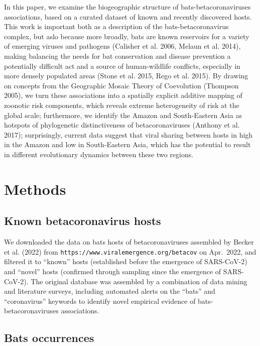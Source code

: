 \documentclass[11pt]{article}
\begin{document}
In this paper, we examine the biogeographic structure of
bats-betacoronaviruses associations, based on a curated dataset of known
and recently discovered hosts. This work is important both as a
description of the bats-betacoronavirus complex, but aslo because more
broadly, bats are known reservoirs for a variety of emerging viruses and
pathogens (Calisher et al. 2006, Melaun et al. 2014), making balancing
the needs for bat conservation and disease prevention a potentially
difficult act and a source of human-wildlife conflicts, especially in
more densely populated areas (Stone et al. 2015, Rego et al. 2015). By
drawing on concepts from the Geographic Mosaic Theory of Coevolution
(Thompson 2005), we turn these associations into a spatially explicit
additive mapping of zoonotic risk components, which reveals extreme
heterogeneity of risk at the global scale; furthermore, we identify the
Amazon and South-Eastern Asia as hotspots of phylogenetic
distinctiveness of betacoronaviruses (Anthony et al. 2017);
surprisingly, current data suggest that viral sharing between hosts in
high in the Amazon and low in South-Eastern Asia, which has the
potential to result in different evolutionary dynamics between these two
regions.

\hypertarget{methods}{%
\section{Methods}\label{methods}}

\hypertarget{known-betacoronavirus-hosts}{%
\subsection{Known betacoronavirus
hosts}\label{known-betacoronavirus-hosts}}

We downloaded the data on bats hosts of betacoronaviruses assembled by
Becker et al. (2022) from
\texttt{https://www.viralemergence.org/betacov} on Apr.~2022, and
filtered it to ``known'' hosts (established before the emergence of
SARS-CoV-2) and ``novel'' hosts (confirmed through sampling since the
emergence of SARS-CoV-2). The original database was assembled by a
combination of data mining and literature surveys, including automated
alerts on the ``bats'' and ``coronavirus'' keywords to identify novel
empirical evidence of bats-betacoronaviruses associations.

\hypertarget{bats-occurrences}{%
\subsection{Bats occurrences}\label{bats-occurrences}}
\end{document}

